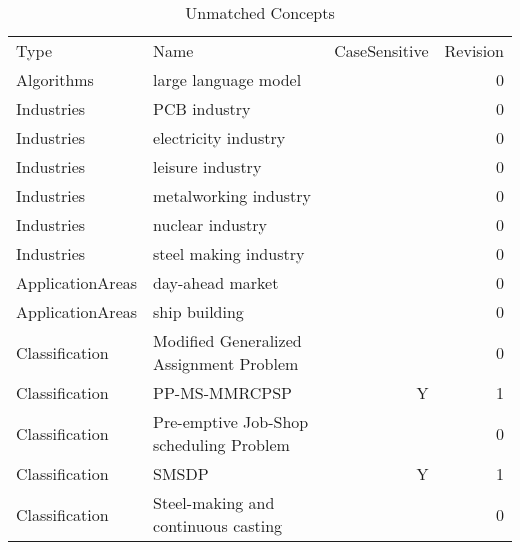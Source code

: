 {\scriptsize
\begin{longtable}{lp{10cm}rr}
\rowcolor{white}\caption{Unmatched Concepts}\\ \toprule
\rowcolor{white}Type & Name & CaseSensitive & Revision\\ \midrule
\endhead
\bottomrule
\endfoot
Algorithms & large language model &  & 0\\Industries & PCB industry &  & 0\\Industries & electricity industry &  & 0\\Industries & leisure industry &  & 0\\Industries & metalworking industry &  & 0\\Industries & nuclear industry &  & 0\\Industries & steel making industry &  & 0\\ApplicationAreas & day-ahead market &  & 0\\ApplicationAreas & ship building &  & 0\\Classification & Modified Generalized Assignment Problem &  & 0\\Classification & PP-MS-MMRCPSP & Y & 1\\Classification & Pre-emptive Job-Shop scheduling Problem &  & 0\\Classification & SMSDP & Y & 1\\Classification & Steel-making and continuous casting &  & 0\\\end{longtable}
}

